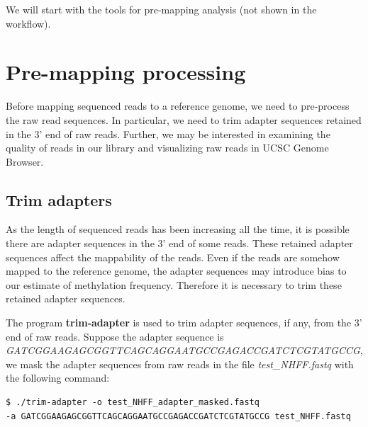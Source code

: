 \documentclass{article}
\begin{document}
\begin{flushleft}We will start with the tools for pre-mapping analysis (not shown in the workflow).
\end{flushleft}

\section{Pre-mapping processing}
\label{sec:premapping}

Before mapping sequenced reads to a reference genome, we need to
pre-process the raw read sequences. In particular, we need to trim
adapter sequences retained in the 3' end of raw
reads. Further, we may be interested in examining the quality of reads
in our library and visualizing raw reads in UCSC Genome Browser. 

\subsection{Trim adapters}
\label{sec:trim-adapter}
As the length of sequenced reads
has been increasing all the time, it is possible there are adapter
sequences in the 3' end of some reads. These retained adapter
sequences affect the mappability of the reads. Even if the reads are
somehow mapped to the reference genome, the adapter sequences may
introduce bias to our estimate of methylation frequency. Therefore it
is necessary to trim these retained adapter sequences. 

The program \textbf{trim-adapter} is used to trim adapter sequences,
if any, from the 3' end of raw reads. Suppose the adapter sequence is
\textit{GATCGGAAGAGCGGTTCAGCAGGAATGCCGAGACCGATCTCGTATGCCG}, we mask
the adapter sequences from raw reads in the file
 \textit{test\_NHFF.fastq} with the
following command:
\begin{verbatim}
$ ./trim-adapter -o test_NHFF_adapter_masked.fastq   
-a GATCGGAAGAGCGGTTCAGCAGGAATGCCGAGACCGATCTCGTATGCCG test_NHFF.fastq  
\end{verbatim}
\end{document}
